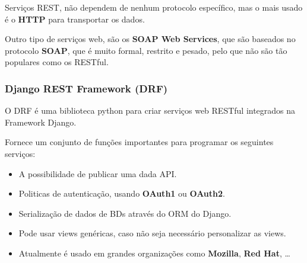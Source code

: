 \documentclass{article}
\begin{document}
Serviços REST, não dependem de nenhum protocolo específico, mas o mais usado é
o \textbf{HTTP} para transportar os dados.

Outro tipo de serviços web, são os \textbf{SOAP Web Services}, que são baseados
no protocolo \textbf{SOAP}, que é muito formal, restrito e pesado, pelo que não são
tão populares como os RESTful.

\subsubsection{Django REST Framework (DRF)}

O DRF é uma biblioteca python para criar serviços web RESTful integrados
na Framework Django.

Fornece um conjunto de funções importantes para programar os seguintes serviços:
\begin{itemize}
  \item A possibilidade de publicar uma dada API.
  \item Politicas de autenticação, usando \textbf{OAuth1} ou \textbf{OAuth2}.
  \item Serialização de dados de BDs através do ORM do Django.
  \item Pode usar views genéricas, caso não seja necessário personalizar as views.
  \item Atualmente é usado em grandes organizações como \textbf{Mozilla}, \textbf{Red Hat}, \dots
\end{itemize}
\end{document}
